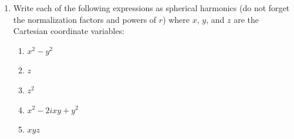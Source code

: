 \documentclass[fleqn]{article}
\begin{document}
\begin{enumerate}
      \textcolor{hwColor}{
        $\delta(x)=\sum\limits_{n=0}^{\infty} P_n$ where $P_n$ is the Legendre polynomials. \\
        \\
        $
          \delta(x)=\sum\limits_{n=0}^{\infty} P_n \Longrightarrow  \delta(x) P_m=\sum\limits_{n=0}^{\infty} P_m P_n
          \\
          \\
          \bigints\limits_{-1}^{1} P_m=P_m(0) 
          \\
          \\
          \bigints\limits_{-1}^{1} P_n P_m=\left(\dfrac{2}{2n+1}\right) 
          \\
          \\
          P_m(0)=a_m \left(\dfrac{2}{2m+1}\right), ~~~ where ~~~ m=n 
          \\
          \\
          \therefore ~~~~ a_m=P_m(0) \left(\dfrac{2m+1}{2}\right)
        $
      }
    
    \item Write each of the following expressions as spherical harmonics (do not forget the normalization factors and powers of $r$) where $x$, $y$, and $z$ are the Cartesian coordinate variables:
    
      \begin{enumerate}
      
        \item $x^{2}-y^{2}$
        
        \item $z$
        
        \item $z^{2}$
        
        \item $x^{2}-2ixy+y^{2}$
        
        \item $xyz$
      \end{enumerate}
    
  \end{enumerate}

  \pagebreak
\end{document}
